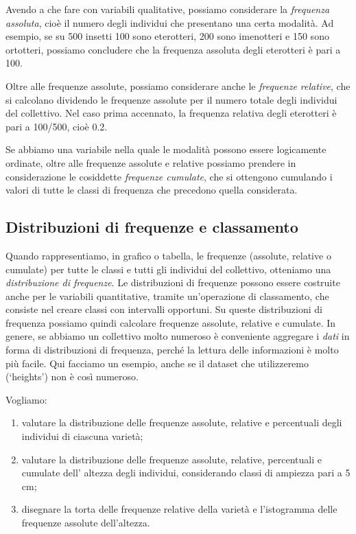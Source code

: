 \documentclass[a4paper,12pt,oneside]{book}
\providecommand{\tightlist}{%
  \setlength{\itemsep}{0pt}\setlength{\parskip}{0pt}}
\begin{document}
Avendo a che fare con variabili qualitative, possiamo considerare la \emph{frequenza assoluta}, cioè il numero degli individui che presentano una certa modalità. Ad esempio, se su 500 insetti 100 sono eterotteri, 200 sono imenotteri e 150 sono ortotteri, possiamo concludere che la frequenza assoluta degli eterotteri è pari a 100.

Oltre alle frequenze assolute, possiamo considerare anche le \emph{frequenze relative}, che si calcolano dividendo le frequenze assolute per il numero totale degli individui del collettivo. Nel caso prima accennato, la frequenza relativa degli eterotteri è pari a 100/500, cioè 0.2.

Se abbiamo una variabile nella quale le modalità possono essere logicamente ordinate, oltre alle frequenze assolute e relative possiamo prendere in considerazione le cosiddette \emph{frequenze cumulate}, che si ottengono cumulando i valori di tutte le classi di frequenza che precedono quella considerata.

\hypertarget{distribuzioni-di-frequenze-e-classamento}{%
\subsection*{Distribuzioni di frequenze e classamento}\label{distribuzioni-di-frequenze-e-classamento}}

Quando rappresentiamo, in grafico o tabella, le frequenze (assolute, relative o cumulate) per tutte le classi e tutti gli individui del collettivo, otteniamo una \emph{distribuzione di frequenze}. Le distribuzioni di frequenze possono essere costruite anche per le variabili quantitative, tramite un'operazione di classamento, che consiste nel creare classi con intervalli opportuni. Su queste distribuzioni di frequenza possiamo quindi calcolare frequenze assolute, relative e cumulate. In genere, se abbiamo un collettivo molto numeroso è conveniente aggregare i \emph{dati} in forma di distribuzioni di frequenza, perché la lettura delle informazioni è molto più facile. Qui facciamo un esempio, anche se il dataset che utilizzeremo (`heights') non è così numeroso.

Vogliamo:

\begin{enumerate}
\def\labelenumi{\arabic{enumi}.}
\tightlist
\item
  valutare la distribuzione delle frequenze assolute, relative e percentuali degli individui di ciascuna varietà;
\item
  valutare la distribuzione delle frequenze assolute, relative, percentuali e cumulate dell' altezza degli individui, considerando classi di ampiezza pari a 5 cm;
\item
  disegnare la torta delle frequenze relative della varietà e l'istogramma delle frequenze assolute dell'altezza.
\end{enumerate}
\end{document}
